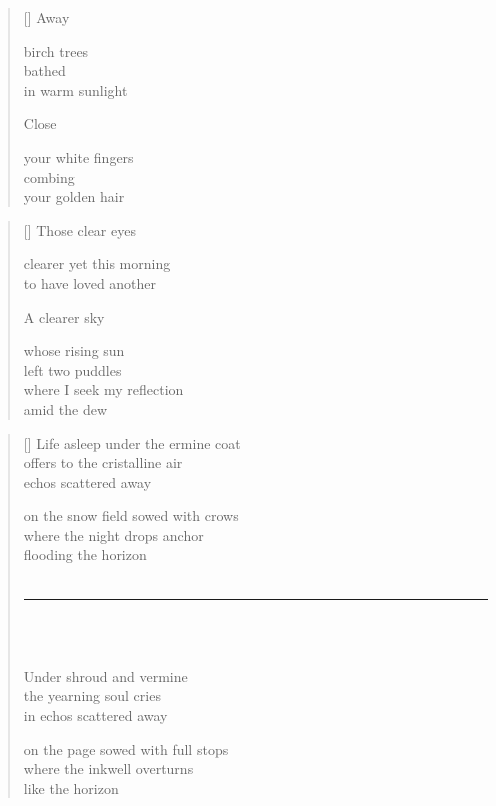 \documentclass[12pt,a4paper]{article}
\begin{document}
\poemtitle{}

\settowidth{\versewidth}{your white fingers}

\bigskip

\begin{verse}[\versewidth]
  Away

  birch trees \\
  bathed \\
  in warm sunlight

  Close

  your white fingers \\
  combing \\
  your golden hair
\end{verse}


\newpage

\poemtitle{}

\settowidth{\versewidth}{where I seek my reflection}

\bigskip

\begin{verse}[\versewidth]
  Those clear eyes

  clearer yet this morning \\
  to have loved another

  A clearer sky

  whose rising sun \\
  left two puddles \\
  where I seek my reflection \\
  amid the dew
\end{verse}


\newpage

\poemtitle{}

\settowidth{\versewidth}{offers to the cristalline air echos}

\bigskip\bigskip

\begin{verse}[\versewidth]
  Life asleep under the ermine coat \\
  offers to the cristalline air \\
  echos scattered away

  on the snow field sowed with crows \\
  where the night drops anchor \\
  flooding the horizon \\ \

  \rule{0.4\textwidth}{0.4pt}
  \\ \

  Under shroud and vermine \\
  the yearning soul cries \\
  in echos scattered away

  on the page sowed with full stops \\
  where the inkwell overturns \\
  like the horizon
\end{verse}
\end{document}
